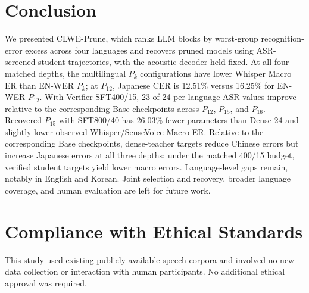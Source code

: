 \documentclass{article}
\begin{document}
\section{Conclusion}
\label{sec:conclusion}

We presented CLWE-Prune, which ranks LLM blocks by worst-group
recognition-error excess across four languages and recovers pruned
models using ASR-screened student trajectories, with the acoustic
decoder held fixed. At all four matched depths, the multilingual
\(P_k\) configurations have lower Whisper Macro ER than EN-WER
\(P_k\); at \(P_{12}\), Japanese CER is 12.51\% versus 16.25\% for
EN-WER \(P_{12}\). With Verifier-SFT400/15, 23 of 24 per-language
ASR values improve relative to the corresponding Base checkpoints
across \(P_{12}\), \(P_{15}\), and \(P_{16}\). Recovered \(P_{15}\)
with SFT800/40 has 26.03\% fewer parameters than Dense-24 and
slightly lower observed Whisper/SenseVoice Macro ER. Relative to
the corresponding Base checkpoints, dense-teacher targets reduce
Chinese errors but increase Japanese errors at all three depths;
under the matched 400/15 budget, verified student targets yield
lower macro errors. Language-level gaps remain, notably in English
and Korean. Joint selection and recovery, broader language coverage,
and human evaluation are left for future work.

\section{Compliance with Ethical Standards}
This study used existing publicly available speech corpora and
involved no new data collection or interaction with human
participants. No additional ethical approval was required.







\begingroup\small
\setlength{\itemsep}{0pt}

\endgroup
\end{document}
